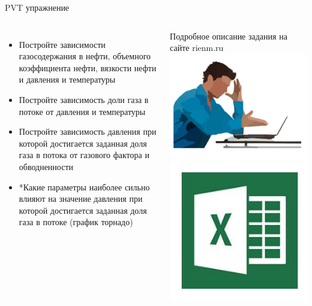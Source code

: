 \begin{frame}{PVT упражнение}
\begin{columns}
    \begin{itemize}
        \item Постройте зависимости газосодержания в нефти, объемного коэффициента нефти, вязкости нефти и давления и температуры
        \item Постройте зависимость доли газа в потоке от давления и температуры
        \item Постройте зависимость давления при которой достигается заданная доля газа в потока от газового фактора и обводненности
        \item*Какие параметры наиболее сильно влияют на значение давления при которой достигается заданная доля газа в потоке (график торнадо)
    \end{itemize}
    Подробное описание задания на сайте rienm.ru
    \includegraphics[scale=0.3]{fig/task.png}
    \newline
    \includegraphics[scale=0.3]{fig/xls.png}
\end{columns}
\end{frame}

